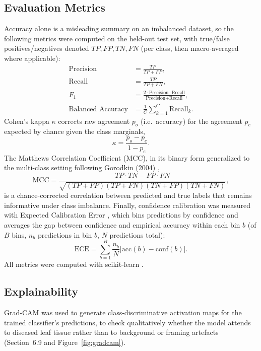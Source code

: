 \documentclass[12pt,a4paper]{article}
\begin{document}
\subsection{Evaluation Metrics}
Accuracy alone is a misleading summary on an imbalanced dataset, so the
following metrics were computed on the held-out test set, with true/false
positives/negatives denoted $TP,FP,TN,FN$ (per class, then macro-averaged
where applicable):
\begin{align}
\text{Precision} &= \frac{TP}{TP+FP}, \label{eq:precision}\\
\text{Recall} &= \frac{TP}{TP+FN}, \label{eq:recall}\\
F_1 &= \frac{2\cdot\text{Precision}\cdot\text{Recall}}{\text{Precision}+\text{Recall}}, \label{eq:f1}\\
\text{Balanced Accuracy} &= \frac{1}{C}\sum_{k=1}^{C} \text{Recall}_k. \label{eq:balacc}
\end{align}
Cohen's kappa $\kappa$ corrects raw agreement $p_o$ (i.e.\ accuracy) for the
agreement $p_e$ expected by chance given the class marginals,
\begin{equation}
\kappa = \frac{p_o - p_e}{1 - p_e}.
\label{eq:kappa}
\end{equation}
The Matthews Correlation Coefficient (MCC), in its binary form generalized to
the multi-class setting following Gorodkin (2004) \cite{gorodkin2004mcc},
\begin{equation}
\text{MCC} = \frac{TP\cdot TN - FP\cdot FN}{\sqrt{(TP+FP)(TP+FN)(TN+FP)(TN+FN)}},
\label{eq:mcc}
\end{equation}
is a chance-corrected correlation between predicted and true labels that
remains informative under class imbalance. Finally, confidence calibration
was measured with Expected Calibration Error \cite{guo2017calibration},
which bins predictions by confidence and averages the gap between confidence
and empirical accuracy within each bin $b$ (of $B$ bins, $n_b$ predictions in
bin $b$, $N$ predictions total):
\begin{equation}
\text{ECE} = \sum_{b=1}^{B} \frac{n_b}{N} \left| \text{acc}(b) - \text{conf}(b) \right|.
\label{eq:ece}
\end{equation}
All metrics were computed with scikit-learn \cite{pedregosa2011sklearn}.

\subsection{Explainability}
Grad-CAM \cite{selvaraju2017gradcam} was used to generate class-discriminative
activation maps for the trained classifier's predictions, to check
qualitatively whether the model attends to diseased leaf tissue rather than
to background or framing artefacts (Section~6.9 and Figure~\ref{fig:gradcam}).
\end{document}
